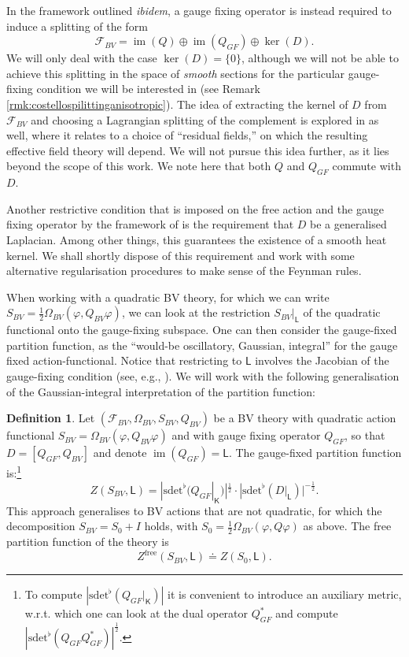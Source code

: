 \documentclass[reqno]{amsart}
\theoremstyle{definition}
\newtheorem{defn}[thm]{Definition}
\theoremstyle{remark}
\newcommand{\F}{\mathcal{F}}
\newcommand{\sfK}{\mathsf{K}}
\newcommand{\sfL}{\mathsf{L}}
\newcommand{\sdet}{\mathrm{sdet}^\flat}
\DeclareMathOperator{\im}{im}
\begin{document}
\begin{rmk}
\label{remark_costello_comparison}
In the framework outlined \emph{ibidem}, a gauge fixing operator is instead required to induce a splitting of the form
\begin{equation}
\label{costello_splitting}
    \F_{BV} = \im(Q)\oplus\im(Q_{GF})\oplus\ker(D).
\end{equation}
We will only deal with the case $\ker(D)=\{0\}$, although we will not be able to achieve this splitting in the space of \emph{smooth} sections for the particular gauge-fixing condition we will be interested in (see Remark \ref{rmk:costellospilittinganisotropic}).  
The idea of extracting the kernel of $D$ from $\F_{BV}$ and choosing a Lagrangian splitting of the complement is explored in \cite{cattaneo-mnev-reshetikhin-quantum} as well, where it relates to a choice of ``residual fields,'' on which the resulting effective field theory will depend. We will not pursue this idea further, as it lies beyond the scope of this work. We note here that both $Q$ and $Q_{GF}$ commute with $D$.

Another restrictive condition that is imposed on the free action and the gauge fixing operator by the framework of \cite{costello} is the requirement that $D$ be a generalised Laplacian. Among other things, this guarantees the existence of a smooth heat kernel. We shall shortly dispose of this requirement and work with some alternative regularisation procedures to make sense of the Feynman rules. 
\end{rmk}

When working with a quadratic BV theory, for which we can write $S_{BV} = \frac12 \Omega_{BV}(\varphi, Q_{BV}\varphi)$, we can look at the restriction $S_{BV}\vert_\sfL$ of the quadratic functional onto the gauge-fixing subspace. 
One can then consider the gauge-fixed partition function, as the ``would-be oscillatory, Gaussian, integral'' for the gauge fixed action-functional. Notice that restricting to $\sfL$ involves the Jacobian of the gauge-fixing condition (see, e.g., \cite[Remark 31]{hadfield_kandel_schiavina}). We will work with the following generalisation of the Gaussian-integral interpretation of the partition function:
\begin{defn}\label{def:partitionfunction}
Let $(\F_{BV}, \Omega_{BV}, S_{BV}, Q_{BV})$ be a BV theory with quadratic action functional $S_{BV}=\Omega_{BV}(\varphi,Q_{BV}\varphi)$ and with gauge fixing operator $Q_{GF}$, so that $D=[Q_{GF},Q_{BV}]$ and denote $\im(Q_{GF})=\sfL$. The gauge-fixed partition function is:\footnote{To compute $|\sdet(Q_{GF}\vert_{\sfK})|$ it is convenient to introduce an auxiliary metric, w.r.t. which one can look at the dual operator $Q_{GF}^*$ and compute $|\sdet(Q_{GF}Q_{GF}^*)|^{\frac{1}{2}}$.}
\[
Z(S_{BV},\sfL) = |\sdet(Q_{GF}|_\sfK)|^{\frac{1}{2}} \cdot |\sdet(D\vert_{\sfL})|^{-\frac{1}{2}}.
\]
This approach generalises to BV actions that are not quadratic, for which the decomposition $S_{BV} = S_0 + I$ holds, with $S_0= \frac12\Omega_{BV}(\varphi, Q \varphi)$ as above. The free partition function of the theory is 
\[
Z^{\text{free}}(S_{BV},\sfL) \doteq Z(S_0,\sfL).
\]
\end{defn}
\end{document}
